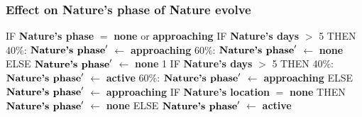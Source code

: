\documentclass{article}%
\begin{document}
\subsubsection{Effect on Nature's phase of Nature evolve}%
\label{ssubsec:Effect on Nature's phase of Nature evolve}%
\begin{flushleft}%
IF %
\textbf{Nature's phase}%
$=$%
\textbf{none}%
 or %
\textbf{approaching}%
\linebreak%
\hspace*{2em}%
IF %
\textbf{Nature's days}%
$>$%
5%
\linebreak%
\hspace*{4em}%
THEN %
\linebreak%
\hspace*{6em}%
40\%: %
$\mbox{\textbf{Nature's phase}} '$%
$\leftarrow$%
\textbf{approaching}%
\linebreak%
\hspace*{6em}%
60\%: %
$\mbox{\textbf{Nature's phase}} '$%
$\leftarrow$%
\textbf{none}%
\linebreak%
\hspace*{4em}%
ELSE %
$\mbox{\textbf{Nature's phase}} '$%
$\leftarrow$%
\textbf{none}%
\linebreak%
\hspace*{2em}%
1 %
IF %
\textbf{Nature's days}%
$>$%
5%
\linebreak%
\hspace*{4em}%
THEN %
\linebreak%
\hspace*{6em}%
40\%: %
$\mbox{\textbf{Nature's phase}} '$%
$\leftarrow$%
\textbf{active}%
\linebreak%
\hspace*{6em}%
60\%: %
$\mbox{\textbf{Nature's phase}} '$%
$\leftarrow$%
\textbf{approaching}%
\linebreak%
\hspace*{4em}%
ELSE %
$\mbox{\textbf{Nature's phase}} '$%
$\leftarrow$%
\textbf{approaching}%
\linebreak%
\hspace*{2em}%
IF %
\textbf{Nature's location}%
$=$%
\textbf{none}%
\linebreak%
\hspace*{4em}%
THEN %
$\mbox{\textbf{Nature's phase}} '$%
$\leftarrow$%
\textbf{none}%
\linebreak%
\hspace*{4em}%
ELSE %
$\mbox{\textbf{Nature's phase}} '$%
$\leftarrow$%
\textbf{active}%
\end{flushleft}
\end{document}
